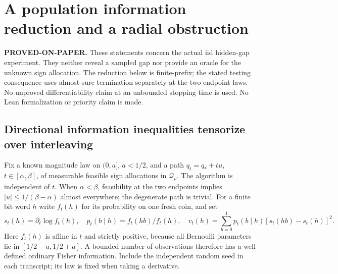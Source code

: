 \section{A population information reduction and a radial obstruction}
\label{sec:population-information}
\noindent\textbf{PROVED-ON-PAPER.} These statements concern the actual iid
hidden-gap experiment. They neither reveal a sampled gap nor provide an
oracle for the unknown sign allocation. The reduction below is finite-prefix;
the stated testing consequence uses almost-sure termination separately at
the two endpoint laws. No unproved differentiability claim at an unbounded
stopping time is used. No Lean formalization or priority claim is made.

\subsection{Directional information inequalities tensorize over interleaving}
Fix a known magnitude law on $(0,a]$, $a<1/2$, and a path
$q_t=q_*+tu$, $t\in[\alpha,\beta]$, of measurable feasible sign
allocations in $\mathcal Q_\rho$. The algorithm is independent of $t$.
When $\alpha<\beta$, feasibility at the two endpoints implies
$|u|\le1/(\beta-\alpha)$ almost everywhere; the degenerate path is trivial.
For a finite bit word $h$ write $f_t(h)$ for its probability on one
fresh coin, and set
\[
 s_t(h)=\partial_t\log f_t(h),\quad
 p_t(b\mid h)=f_t(hb)/f_t(h),\quad
 v_t(h)=\sum_{b=0}^1p_t(b\mid h)
                  [s_t(hb)-s_t(h)]^2.
\]
Here $f_t(h)$ is affine in $t$ and strictly positive, because all Bernoulli
parameters lie in $[1/2-a,1/2+a]$. A bounded number of observations therefore
has a well-defined ordinary Fisher information. Include the independent
random seed in each transcript; its law is fixed when taking a derivative.

